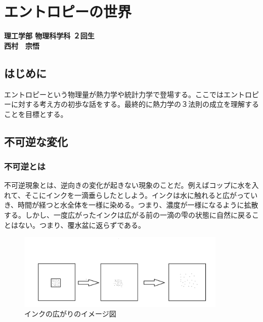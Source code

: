 
\chapter{エントロピーの世界}
\vspace{-45pt} %
\begin{flushright}
  {\bf \large 理工学部 物理科学科 ２回生} \\ \vspace{3pt} %
  {\bf \large 西村　宗悟} \\ \vspace{30pt} %
\end{flushright}

\section*{はじめに}
エントロピーという物理量が熱力学や統計力学で登場する。ここではエントロピーに対する考え方の初歩な話をする。最終的に熱力学の３法則の成立を理解することを目標とする。

%
\section{不可逆な変化}
\label{sec:hukagyaku}
%
\subsection{不可逆とは}
不可逆現象とは、逆向きの変化が起きない現象のことだ。例えばコップに水を入れて、そこにインクを一滴垂らしたとしよう。インクは水に触れると広がっていき、時間が経つと水全体を一様に染める。つまり、濃度が一様になるように拡散する。しかし、一度広がったインクは広がる前の一滴の雫の状態に自然に戻ることはない。つまり、覆水盆に返らずである。\par\begin{figure}[H]
  \centering
  \includegraphics[width=10cm]{nishimura/image/2017112201.png}
  \caption{インクの広がりのイメージ図}
\end{figure}

